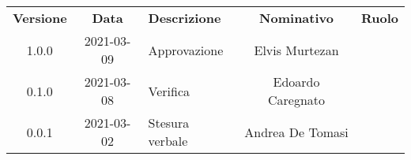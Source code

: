 {
    \renewcommand{\arraystretch}{1.5}
    \centering
    \begin{longtable}{ c c  C{4cm}  c  c }
        \rowcolor{\primaryColor}
        \textcolor{\secondaryColor}{
        \textbf{Versione}}     & \textcolor{\secondaryColor}{\textbf{Data}}       & \textcolor{\secondaryColor}
        {\textbf{Descrizione}} & \textcolor{\secondaryColor}{\textbf{Nominativo}} & \textcolor{\secondaryColor}{\textbf{Ruolo}}                          \\


        1.0.0                  & 2021-03-09                                       & Approvazione                                & Elvis Murtezan & \responsabile{} \\
        0.1.0                  & 2021-03-08                                       & Verifica                                & Edoardo Caregnato & \verificatore{} \\
        0.0.1                  & 2021-03-02                                       & Stesura verbale                                & Andrea De Tomasi & \redattore{} \\
    \end{longtable}
}
